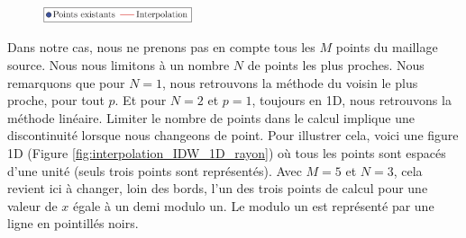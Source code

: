 \vspace{-0.5cm}

\begin{figure}[H]
    \centering
    \includegraphics[width=0.39\textwidth]{images/legende-interp3.png}
\end{figure}

\newpage

Dans notre cas, nous ne prenons pas en compte tous les \(M\) points du maillage source. Nous nous limitons à un nombre \(N\) de points les plus proches. 
Nous remarquons que pour \( N = 1 \), nous retrouvons la méthode du voisin le plus proche, pour tout \( p \).
Et pour \( N = 2 \) et \( p = 1 \), toujours en 1D, nous retrouvons la méthode linéaire.
Limiter le nombre de points dans le calcul implique une discontinuité lorsque nous changeons de point. Pour illustrer cela, voici une figure 1D (Figure \ref{fig:interpolation_IDW_1D_rayon}) où tous les points sont espacés d'une unité (seuls trois points sont représentés). Avec \(M = 5\) et \(N = 3\), cela revient ici à changer, loin des bords, l'un des trois points de calcul pour une valeur de \(x\) égale à un demi modulo un. Le modulo un est représenté par une ligne en pointillés noirs.%


